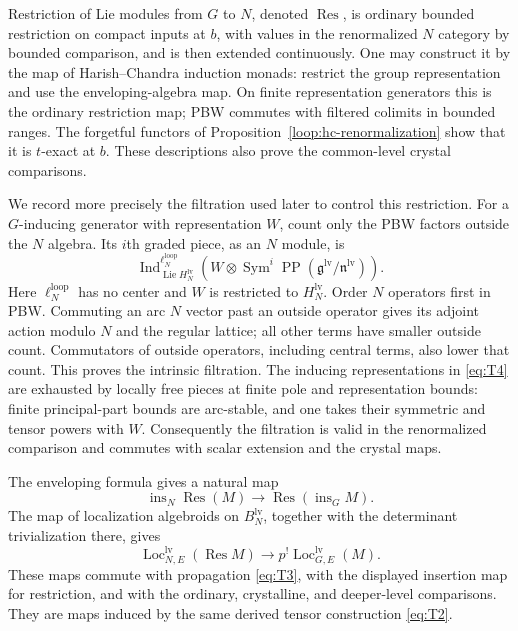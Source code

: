 Restriction of Lie modules from $G$ to $N$, denoted
$\operatorname{Res}$, is ordinary bounded restriction on compact
inputs at $b$, with values in the renormalized $N$ category by bounded
comparison, and is then extended continuously.  One may construct it
by the map of Harish--Chandra induction monads: restrict the group
representation and use the enveloping-algebra map.  On finite
representation generators this is the ordinary restriction map;
PBW commutes with filtered colimits in bounded ranges.  The
forgetful functors of Proposition~\ref{loop:hc-renormalization}
show that it is $t$-exact at $b$.
These descriptions also prove the common-level crystal comparisons.

We record more precisely the filtration used later to control this
restriction.  For a $G$-inducing generator with representation $W$,
count only the PBW factors outside the $N$ algebra.  Its $i$th graded
piece, as an $N$ module, is
\begin{equation}\label{eq:T4}
 \operatorname{Ind}_{\operatorname{Lie}H_N^{\mathrm{lv}}}
                   ^{\ell_N^{\mathrm{loop}}}
 \left(W\otimes
  \operatorname{Sym}^i\operatorname{PP}(
                     \mathfrak g^{\mathrm{lv}}/
                     \mathfrak n^{\mathrm{lv}})\right).
\end{equation}
Here $\ell_N^{\mathrm{loop}}$ has no center and $W$ is restricted to
$H_N^{\mathrm{lv}}$.  Order $N$ operators first in PBW.  Commuting an
arc $N$ vector past an outside operator gives its adjoint action
modulo $N$ and the regular lattice; all other terms have smaller
outside count.  Commutators of outside operators, including central
terms, also lower that count.  This proves the intrinsic filtration.
The inducing representations in \eqref{eq:T4} are exhausted by
locally free pieces at finite pole and representation bounds:
finite principal-part bounds are arc-stable, and one takes their
symmetric and tensor powers with $W$.  Consequently the filtration
is valid in the renormalized comparison and commutes with scalar
extension and the crystal maps.

The enveloping formula gives a natural map
\[
 \operatorname{ins}_N\operatorname{Res}(M)
       \longrightarrow
       \operatorname{Res}(\operatorname{ins}_G M).
\]
The map of localization algebroids on $B_N^{\mathrm{lv}}$, together
with the determinant trivialization there, gives
\begin{equation}\label{eq:T5}
 \operatorname{Loc}_{N,E}^{\mathrm{lv}}(
                              \operatorname{Res}M)
       \longrightarrow
 p^!\operatorname{Loc}_{G,E}^{\mathrm{lv}}(M).
\end{equation}
These maps commute with propagation \eqref{eq:T3}, with the displayed
insertion map for restriction, and with the ordinary, crystalline,
and deeper-level comparisons.  They are maps induced by the same
derived tensor construction \eqref{eq:T2}.

